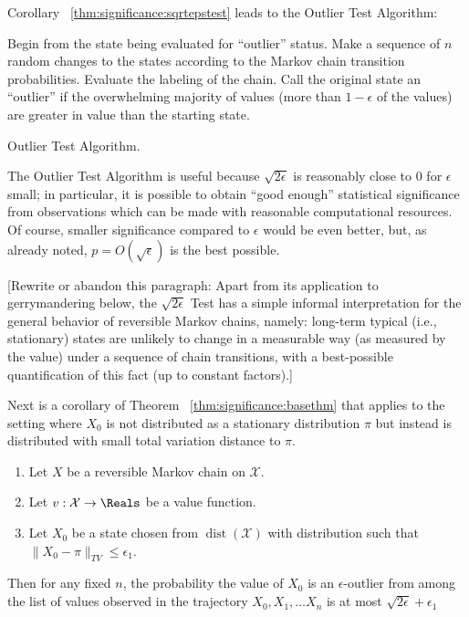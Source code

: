 \documentclass[12pt]{article}
\begin{document}
Corollary~%
\ref{thm:significance:sqrtepstest} leads to the Outlier Test Algorithm:%

\begin{algorithm}[H]
      Begin from the state being evaluated
    for ``outlier'' status.\; Make a sequence of \( n \) random changes
    to the states according to the Markov chain transition
    probabilities.\; Evaluate the labeling of the chain.\; Call the
    original state an ``outlier'' if the overwhelming majority of values
    (more than \( 1 - \epsilon \) of the values) are greater in value
    than the starting state.\;
    \caption{Outlier Test Algorithm.}
\end{algorithm}

The Outlier Test Algorithm is useful because \( \sqrt{2\epsilon} \) is
reasonably close to \( 0 \) for \( \epsilon \) small; in particular, it
is possible to obtain ``good enough'' statistical significance from
observations which can be made with reasonable computational resources.
Of course, smaller significance compared to \( \epsilon \) would be even
better, but, as already noted, \( p = O(\sqrt{\epsilon}) \) is the best
possible.

[Rewrite or abandon this paragraph:
Apart from its application to gerrymandering below, the \( \sqrt{2\epsilon}
\) Test has a simple informal interpretation for the general behavior of
reversible Markov chains, namely:  long-term typical (i.e., stationary)
states are unlikely to change in a measurable way (as measured by the
value) under a sequence of chain transitions, with a best-possible
quantification of this fact (up to constant factors).]

Next is a corollary of Theorem~%
\ref{thm:significance:basethm} that applies to the setting where \( X_0 \)
is not distributed as a stationary distribution \( \pi \) but instead is
distributed with small total variation distance to \( \pi \).

\begin{corollary}
    \begin{enumerate}
        \item
            Let \( X \) be a reversible Markov chain on \( \mathcal{X} \).
        \item
            Let \( v :  \mathcal{X} \to \Reals \) be a value function.
        \item
            Let \( X_0 \) be a state chosen from \( \operatorname{dist}(\mathcal{X}) \) with
            distribution such that \( \| X_0 - \pi \|_{TV} \le \epsilon_1
            \).
    \end{enumerate}
    Then for any fixed \( n \), the probability the value of \( X_0 \)
    is an \( \epsilon \)-outlier from among the list of values observed
    in the trajectory \( X_0, X_1, \dots X_n \) is at most \( \sqrt{2\epsilon}
    + \epsilon_1 \)
\end{corollary}
\end{document}
